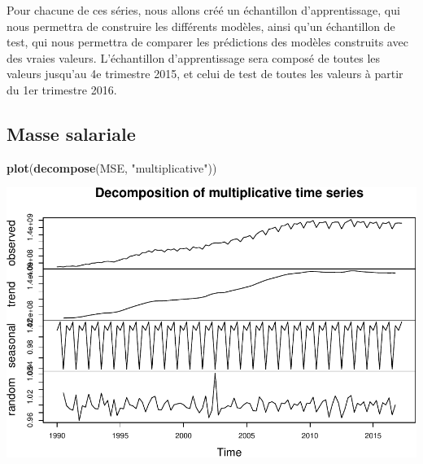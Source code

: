 \documentclass[11pt,]{article}
\newenvironment{Shaded}{\begin{snugshade}}{\end{snugshade}}
\newcommand{\KeywordTok}[1]{\textcolor[rgb]{0.13,0.29,0.53}{\textbf{{#1}}}}
\newcommand{\StringTok}[1]{\textcolor[rgb]{0.31,0.60,0.02}{{#1}}}
\newcommand{\NormalTok}[1]{{#1}}
\begin{document}
Pour chacune de ces séries, nous allons créé un échantillon
d'apprentissage, qui nous permettra de construire les différents
modèles, ainsi qu'un échantillon de test, qui nous permettra de comparer
les prédictions des modèles construits avec des vraies valeurs.
L'échantillon d'apprentissage sera composé de toutes les valeurs
jusqu'au 4e trimestre 2015, et celui de test de toutes les valeurs à
partir du 1er trimestre 2016.

\subsection{Masse salariale}\label{masse-salariale-1}

\begin{Shaded}
\begin{Highlighting}[]
  \KeywordTok{plot}\NormalTok{(}\KeywordTok{decompose}\NormalTok{(MSE, }\StringTok{"multiplicative"}\NormalTok{))}
\end{Highlighting}
\end{Shaded}

\includegraphics{doc_files/figure-latex/unnamed-chunk-6-1.pdf}
\end{document}
